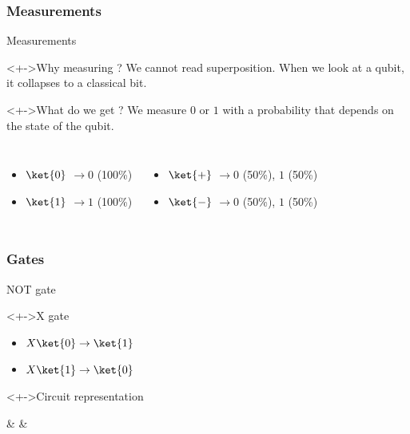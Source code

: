 \documentclass{beamer}
\begin{document}
\subsubsection*{Measurements}
\begin{frame}{Measurements}
	\begin{linenumbers}
		\begin{block}<+->{Why measuring ?}
			We cannot read superposition. When we look at a qubit, it collapses to a classical bit.
		\end{block}
		\begin{block}<+->{What do we get ?}
			We measure $0$ or $1$ with a probability that depends on the state of the qubit.
			\begin{columns}[T,onlytextwidth]
					\begin{itemize}[<+->]
						\item $\ket{0}$ $\rightarrow 0$ (100\%)
						\item $\ket{1}$ $\rightarrow 1$ (100\%)
					\end{itemize}
					\begin{itemize}[<+->]
						\item $\ket{+}$ $\rightarrow 0$ (50\%), $1$ (50\%)
					\item $\ket{-}$ $\rightarrow 0$ (50\%), $1$ (50\%)
					\end{itemize}
			\end{columns}
		\end{block}
	\end{linenumbers}
\end{frame}

\subsubsection*{Gates}
\begin{frame}{NOT gate}
\begin{linenumbers}
    \begin{block}<+->{X gate}
			\begin{itemize}
					\item $X\ket{0} \rightarrow \ket{1}$
					\item $X\ket{1} \rightarrow \ket{0}$
			\end{itemize}
		\end{block}
		\begin{block}<+->{Circuit representation}
			\centering
			\begin{quantikz}
				\lstick{$\ket{\psi}$} &  & \meter{}
			\end{quantikz}
    \end{block}
\end{linenumbers}
\end{frame}
\end{document}
